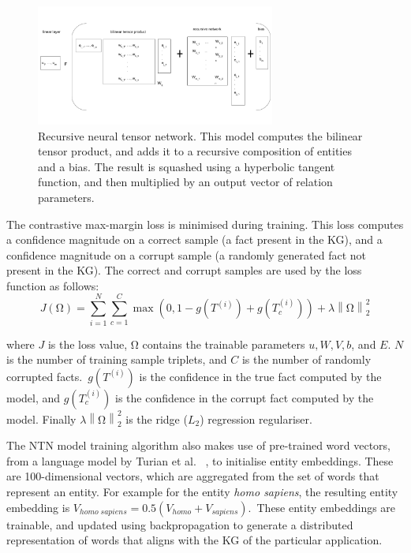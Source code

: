 \begin{figure}[H]
   	\centering
    	\includegraphics[width=0.7\textwidth, height=0.4\textwidth]{recursive_neural_tensor_network.png}
	\captionsetup{justification=centering}
	\caption{Recursive neural tensor network. This model computes the bilinear tensor product, and adds it to a recursive composition of entities and a bias. The result is squashed using a hyperbolic tangent function, and then multiplied by an output vector of relation parameters.}
\end{figure}

\noindent The contrastive max-margin loss is minimised during training. This loss computes a confidence magnitude on a correct sample (a fact present in the KG), and a confidence magnitude on a corrupt sample (a randomly generated fact not present in the KG). The correct and corrupt samples are used by the loss function as follows:
\begin{equation}
	J(\si{\ohm}) =  \sum_{i=1}^N \sum_{c=1}^C \max(0,1 - g(T^{(i)}) + g(T_c^{(i)})) + \lambda \left \lVert \si{\ohm} \right \rVert_2^2
\end{equation}

\noindent where $J$ is the loss value, $\si{\ohm}$ contains the trainable parameters $u, W, V, b $, and $ E $. $N$ is the number of training sample triplets, and $ C $ is the number of randomly corrupted facts.\ $ g(T^{(i)}) $ is the confidence in the true fact computed by the model, and $ g(T_c^{(i)}) $ is the confidence in the corrupt fact computed by the model. Finally $\lambda\left\lVert \si{\ohm} \right\rVert_2^2$ is the ridge ($L_2$) regression regulariser. \par

\noindent The NTN model training algorithm also makes use of pre-trained word vectors, from a language model by Turian et al. \unskip ~\citep{turian2010word}, to initialise entity embeddings. These are 100-dimensional vectors, which are aggregated from the set of words that represent an entity. For example for the entity \textit{homo sapiens}, the resulting entity embedding is $V_{homo \; sapiens} = 0.5(V_{homo} + V_{sapiens})$.\ These entity embeddings are trainable, and updated using backpropagation to generate a distributed representation of words that aligns with the KG of the particular application. \par

